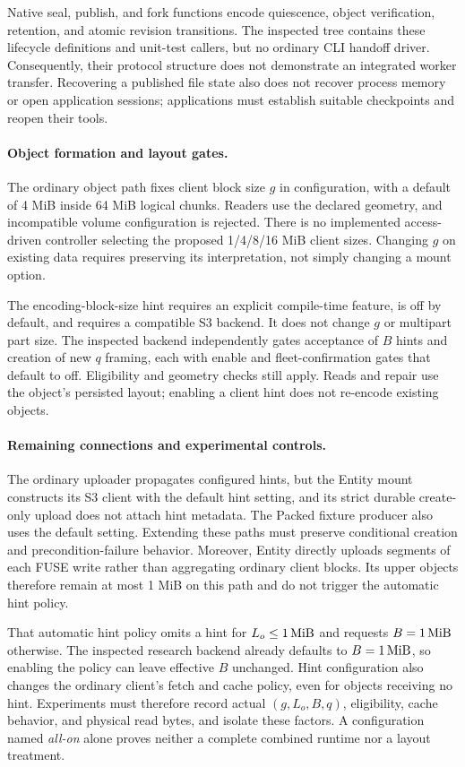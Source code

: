 Native seal, publish, and fork functions encode quiescence, object
verification, retention, and atomic revision transitions. The inspected
tree contains these lifecycle definitions and unit-test callers, but no
ordinary CLI handoff driver. Consequently, their protocol structure
does not demonstrate an integrated worker transfer. Recovering a published
file state also does not recover process memory or open application
sessions; applications must establish suitable checkpoints and reopen
their tools.

\paragraph{Object formation and layout gates.}
The ordinary object path fixes client block size $g$ in configuration,
with a default of 4 MiB inside 64 MiB logical chunks. Readers use the
declared geometry, and incompatible volume configuration is rejected.
There is no implemented access-driven controller selecting the proposed
1/4/8/16 MiB client sizes. Changing $g$ on existing data requires preserving
its interpretation, not simply changing a mount option.

The encoding-block-size hint requires an explicit compile-time feature,
is off by default, and requires a compatible S3 backend. It does not change
$g$ or multipart part size. The inspected backend independently gates
acceptance of $B$ hints and creation of new $q$ framing, each with enable
and fleet-confirmation gates that default to off. Eligibility and geometry
checks still apply. Reads and repair use the object's persisted layout;
enabling a client hint does not re-encode existing objects.

\paragraph{Remaining connections and experimental controls.}
The ordinary uploader propagates configured hints, but the Entity mount
constructs its S3 client with the default hint setting, and its strict
durable create-only upload does not attach hint metadata. The Packed
fixture producer also uses the default setting. Extending these paths must
preserve conditional creation and precondition-failure behavior. Moreover,
Entity directly uploads segments of each FUSE write rather than aggregating
ordinary client blocks. Its upper objects therefore remain at most 1 MiB
on this path and do not trigger the automatic hint policy.

That automatic hint policy omits a hint for $L_o\leq1\,\mathrm{MiB}$ and requests
$B=1\,\mathrm{MiB}$ otherwise. The inspected research backend already defaults to
$B=1\,\mathrm{MiB}$, so enabling the policy can leave effective $B$ unchanged.
Hint configuration also changes the ordinary client's fetch and cache
policy, even for objects receiving no hint. Experiments must therefore
record actual $(g,L_o,B,q)$, eligibility, cache behavior, and physical
read bytes, and isolate these factors. A configuration named \emph{all-on}
alone proves neither a complete combined runtime nor a layout treatment.
